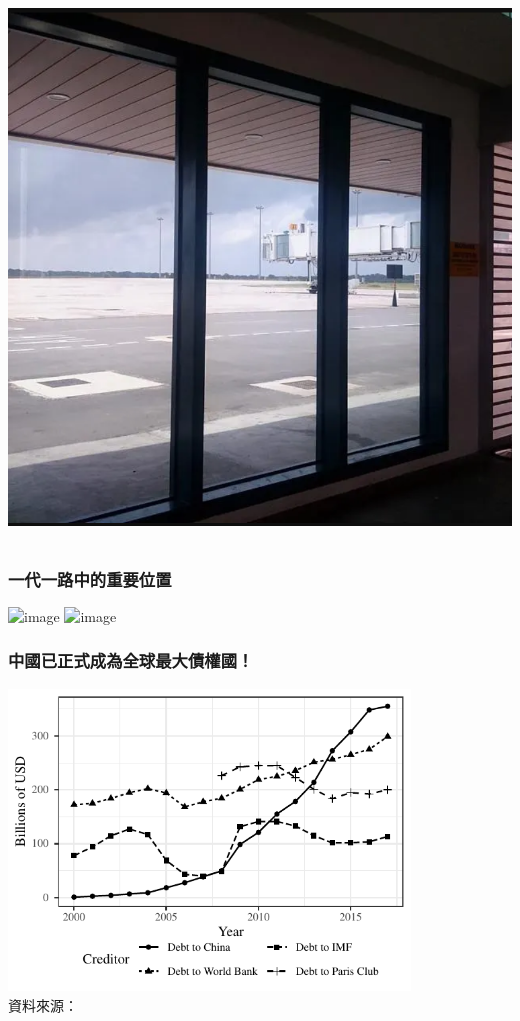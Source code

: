 \documentclass[mathserif]{beamer}
\begin{document}
\begin{frame}
\begin{columns}
\begin{column}{0.48\textwidth}
                    \includegraphics[width = \textwidth]{fig/empty_airport.png}
            \end{column}
        \end{columns}
    \end{frame}

    \begin{frame}
        \frametitle{一代一路中的重要位置}
        \includegraphics<1>[width = \textwidth]{fig/BRI.png}%
        \includegraphics<2>[width = \textwidth]{fig/BRI_2.png}%
    \end{frame}

    \begin{frame}
        \frametitle{中國已正式成為全球最大債權國！}
        \centering
        \includegraphics[width = 0.8\textwidth]{fig/aggr_debt_source.pdf}\\
        \small 資料來源：\citet*{Horn-Reinhart-Trebesch-21}
    \end{frame}
\end{document}

